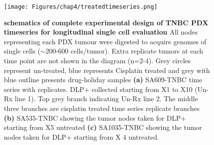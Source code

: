 \begin{figure}
\centering
\texttt{[image: Figures/chap4/treatedtimeseries.png]}
  \caption[TNBC PDX timeseries clonal dynamics under drug perturbations]
	{\small
	\textbf{schematics of complete experimental design of TNBC PDX timeseries for longitudinal single cell evaluation}
	     All nodes representing each PDX tumour were digested to acquire genomes of single cells ($\sim$200-600 cells/tumor). Extra replicate tumors at each time point are not shown in the diagram (n=2-4). Grey circles represent un-treated, blue represents Cisplatin treated and grey with blue outline presents drug-holiday samples 
	     \textbf{(a)} SA609-TNBC time series with replicates. DLP+ collected starting from X1 to X10 (Un-Rx line 1). Top grey branch indicating Un-Rx line 2. The middle three branches are cisplatin treated time series replicate branches 
	     \textbf{(b)} SA535-TNBC  showing the tumor nodes taken for DLP+ starting from X5 untreated  \textbf{(c)} SA1035-TNBC  showing the tumor nodes taken for DLP+ starting from X 4 untreated.}
     \label{fig:treatedtimeseriesmanuscript}

\end{figure}


